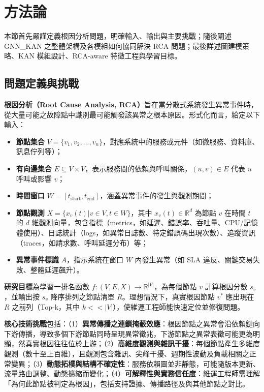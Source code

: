 \documentclass[10pt,a4paper,twocolumn]{article}
\begin{document}
\section{方法論}

本節首先嚴謹定義根因分析問題，明確輸入、輸出與主要挑戰；隨後闡述 GNN\_KAN 之整體架構及各模組如何協同解決 RCA 問題；最後詳述圖建模策略、KAN 模組設計、RCA-aware 特徵工程與學習目標。

\subsection{問題定義與挑戰}

\textbf{根因分析（Root Cause Analysis, RCA）}旨在當分散式系統發生異常事件時，從大量可能之故障點中識別最可能觸發該異常之根本原因。形式化而言，給定以下輸入：

\begin{itemize}
\item \textbf{節點集合} $V = \{v_1, v_2, ..., v_n\}$，對應系統中的服務或元件（如微服務、資料庫、訊息佇列等）；
\item \textbf{有向邊集合} $E \subseteq V \times V$，表示服務間的依賴與呼叫關係，$(u, v) \in E$ 代表 $u$ 呼叫或影響 $v$；
\item \textbf{時間窗口} $W = [t_{\text{start}}, t_{\text{end}}]$，涵蓋異常事件的發生與觀測期間；
\item \textbf{節點觀測} $X = \{x_v(t) | v \in V, t \in W\}$，其中 $x_v(t) \in \mathbb{R}^d$ 為節點 $v$ 在時間 $t$ 的 $d$ 維觀測向量，包含指標（metrics，如延遲、錯誤率、吞吐量、CPU/記憶體使用）、日誌統計（logs，如異常日誌數、特定錯誤碼出現次數）、追蹤資訊（traces，如請求數、呼叫延遲分布）等；
\item \textbf{異常事件標識} $A$，指示系統在窗口 $W$ 內發生異常（如 SLA 違反、關鍵交易失敗、整體延遲飆升）。
\end{itemize}

\textbf{研究目標}為學習一排名函數 $f: (V, E, X) \to \mathbb{R}^{|V|}$，為每個節點 $v$ 計算根因分數 $s_v$，並輸出按 $s_v$ 降序排列之節點清單 $R$。理想情況下，真實根因節點 $v^*$ 應出現在 $R$ 之前列（Top-k，其中 $k << |V|$），使維運工程師能快速定位並修復問題。

\textbf{核心技術挑戰}包括：（1）\textbf{異常傳播之連鎖掩蔽效應}：根因節點之異常會沿依賴鏈向下游傳播，導致多個下游節點同時呈現異常徵兆，下游節點之異常表徵可能更為明顯，然真實根因往往位於上游；（2）\textbf{高維度觀測與雜訊干擾}：每個節點產生多維度觀測（數十至上百維），且觀測包含雜訊、尖峰干擾、週期性波動及負載相關之正常變異；（3）\textbf{動態拓樸與結構不確定性}：服務依賴圖並非靜態，可能隨版本更新、流量路由調整、動態擴縮而變化；（4）\textbf{可解釋性與實務信任度}：維運工程師需理解「為何此節點被判定為根因」，包括支持證據、傳播路徑及與其他節點之對比。
\end{document}
